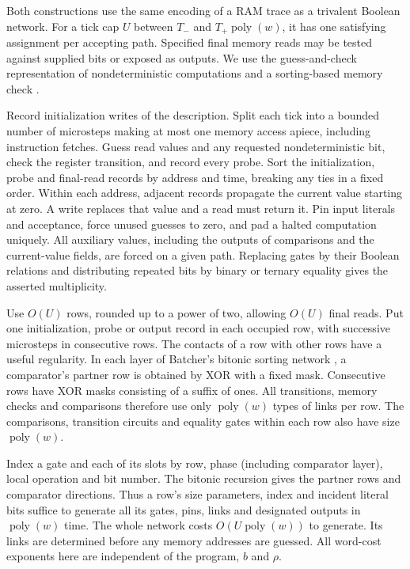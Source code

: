 Both constructions use the same encoding of a RAM trace as a trivalent
Boolean network.
For a tick cap $U$ between $T_-$ and $T_+\operatorname{poly}(w)$,
it has one satisfying assignment per accepting path. Specified final
memory reads may be tested against supplied bits or exposed as outputs.
We use the guess-and-check representation of nondeterministic
computations \cite{Cook} and a sorting-based memory check
\cite{TinyRAM}.

Record initialization writes of the description. Split each tick into
a bounded number of microsteps making at most one memory access apiece,
including instruction fetches. Guess read values and any requested
nondeterministic bit, check the register transition, and record every
probe. Sort the initialization, probe and final-read records by address
and time, breaking any ties in a fixed order. Within each address,
adjacent records propagate the current value starting at zero. A write
replaces that value and a read must return it. Pin input literals and
acceptance, force unused guesses to zero, and pad a halted computation
uniquely. All auxiliary values, including the outputs of comparisons
and the current-value fields, are forced on a given path. Replacing
gates by their Boolean relations and distributing repeated bits by
binary or ternary equality gives the asserted multiplicity.

Use $O(U)$ rows, rounded up to a power of two, allowing $O(U)$ final
reads. Put one initialization, probe or output record in each occupied
row, with successive microsteps in consecutive rows. The contacts of a
row with other rows have a useful regularity. In each layer of
Batcher's bitonic sorting network \cite{Batcher}, a comparator's partner
row is obtained by XOR with a fixed mask. Consecutive rows have XOR
masks consisting of a suffix of ones. All transitions, memory checks
and comparisons therefore use only $\operatorname{poly}(w)$ types
of links per row. The comparisons, transition circuits and equality
gates within each row also have size $\operatorname{poly}(w)$.

Index a gate and each of its slots by row, phase (including comparator
layer), local operation and bit number. The bitonic recursion gives
the partner rows and comparator directions. Thus a row's size
parameters, index and incident literal bits suffice to generate all
its gates, pins, links and designated outputs in $\operatorname{poly}(w)$
time. The whole network costs $O(U\operatorname{poly}(w))$ to generate.
Its links are determined before any memory addresses are guessed.
All word-cost exponents here are independent of the program, $b$ and
$\rho$.

